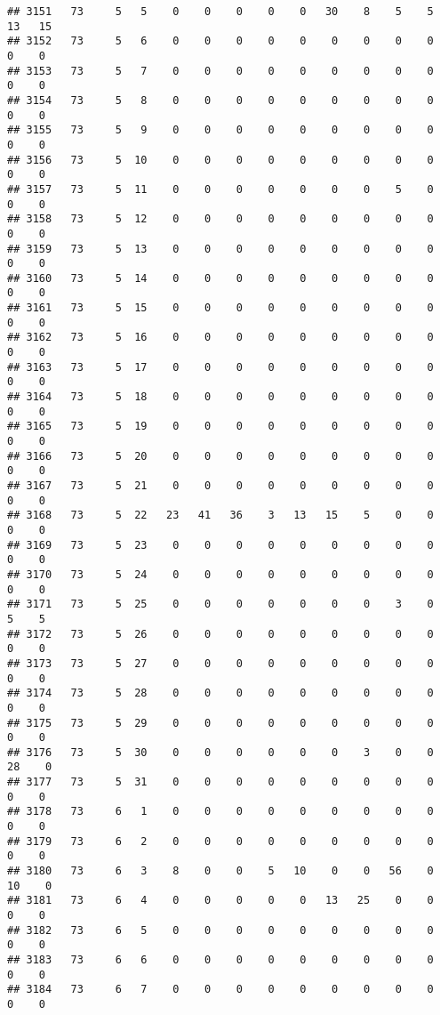 \documentclass[]{article}
\begin{document}
\begin{verbatim}
## 3151   73     5   5    0    0    0    0    0   30    8    5    5   13   15
## 3152   73     5   6    0    0    0    0    0    0    0    0    0    0    0
## 3153   73     5   7    0    0    0    0    0    0    0    0    0    0    0
## 3154   73     5   8    0    0    0    0    0    0    0    0    0    0    0
## 3155   73     5   9    0    0    0    0    0    0    0    0    0    0    0
## 3156   73     5  10    0    0    0    0    0    0    0    0    0    0    0
## 3157   73     5  11    0    0    0    0    0    0    0    5    0    0    0
## 3158   73     5  12    0    0    0    0    0    0    0    0    0    0    0
## 3159   73     5  13    0    0    0    0    0    0    0    0    0    0    0
## 3160   73     5  14    0    0    0    0    0    0    0    0    0    0    0
## 3161   73     5  15    0    0    0    0    0    0    0    0    0    0    0
## 3162   73     5  16    0    0    0    0    0    0    0    0    0    0    0
## 3163   73     5  17    0    0    0    0    0    0    0    0    0    0    0
## 3164   73     5  18    0    0    0    0    0    0    0    0    0    0    0
## 3165   73     5  19    0    0    0    0    0    0    0    0    0    0    0
## 3166   73     5  20    0    0    0    0    0    0    0    0    0    0    0
## 3167   73     5  21    0    0    0    0    0    0    0    0    0    0    0
## 3168   73     5  22   23   41   36    3   13   15    5    0    0    0    0
## 3169   73     5  23    0    0    0    0    0    0    0    0    0    0    0
## 3170   73     5  24    0    0    0    0    0    0    0    0    0    0    0
## 3171   73     5  25    0    0    0    0    0    0    0    3    0    5    5
## 3172   73     5  26    0    0    0    0    0    0    0    0    0    0    0
## 3173   73     5  27    0    0    0    0    0    0    0    0    0    0    0
## 3174   73     5  28    0    0    0    0    0    0    0    0    0    0    0
## 3175   73     5  29    0    0    0    0    0    0    0    0    0    0    0
## 3176   73     5  30    0    0    0    0    0    0    3    0    0   28    0
## 3177   73     5  31    0    0    0    0    0    0    0    0    0    0    0
## 3178   73     6   1    0    0    0    0    0    0    0    0    0    0    0
## 3179   73     6   2    0    0    0    0    0    0    0    0    0    0    0
## 3180   73     6   3    8    0    0    5   10    0    0   56    0   10    0
## 3181   73     6   4    0    0    0    0    0   13   25    0    0    0    0
## 3182   73     6   5    0    0    0    0    0    0    0    0    0    0    0
## 3183   73     6   6    0    0    0    0    0    0    0    0    0    0    0
## 3184   73     6   7    0    0    0    0    0    0    0    0    0    0    0

\end{verbatim}
\end{document}
